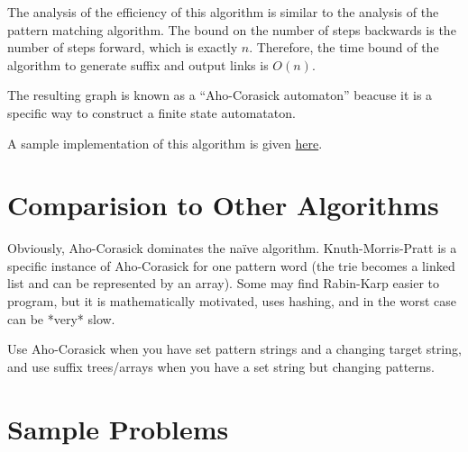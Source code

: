 \documentclass[11pt, oneside]{article}
\begin{document}
The analysis of the efficiency of this algorithm is similar to the analysis of the pattern matching algorithm.
The bound on the number of steps backwards is the number of steps forward, which is exactly \( n \).
Therefore, the time bound of the algorithm to generate suffix and output links is \( O(n) \).

The resulting graph is known as a ``Aho-Corasick automaton'' beacuse it is a specific way to construct
a finite state automataton.

A sample implementation of this algorithm is given \href{https://gist.github.com/stephen-huan/aa609965c86d750736398c28b025f9be#matching}{here}.

\section{Comparision to Other Algorithms}

Obviously, Aho-Corasick dominates the naïve algorithm. Knuth-Morris-Pratt is a specific instance of
Aho-Corasick for one pattern word (the trie becomes a linked list and can be represented by an array).
Some may find Rabin-Karp easier to program, but it is mathematically motivated, uses hashing,
and in the worst case can be *very* slow.

Use Aho-Corasick  when you have set pattern strings and a changing target string,
and use suffix trees/arrays when you have a set string but changing patterns.

\newpage

\section{Sample Problems}
\end{document}
